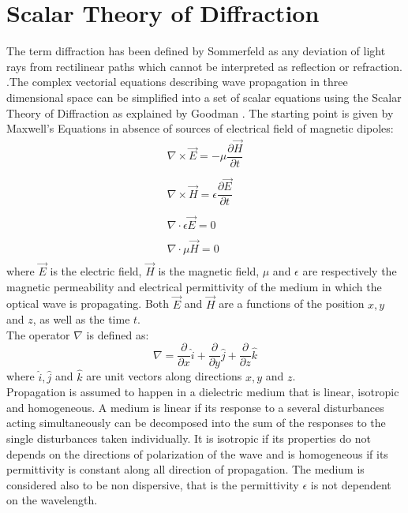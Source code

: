 \section{Scalar Theory of Diffraction}
\label{sec:scalar}
The term diffraction has been defined by Sommerfeld as any deviation of light rays from rectilinear paths which cannot be interpreted as reflection or refraction. \cite{sommerfeld1954optics}.The complex vectorial equations describing wave propagation in three dimensional space can be simplified into a set of scalar equations using the Scalar Theory of Diffraction as explained by Goodman \cite{goodman2005introduction}.
The starting point is given by Maxwell's Equations in absence of sources of electrical field of magnetic dipoles:\\
\begin{equation}
\label{eq:maxwell}
\begin{matrix}
	\nabla\times\overrightarrow{E}=-\mu\dfrac{\partial\overrightarrow{H}}{\partial t}\\
	\\
	\nabla\times\overrightarrow{H}=\epsilon\dfrac{\partial\overrightarrow{E}}{\partial t}\\
	\\
	\nabla\cdot\epsilon\overrightarrow{E}=0\\
	\\
	\nabla\cdot\mu\overrightarrow{H}=0\\
	\end{matrix}
\end{equation}
where $\overrightarrow{E}$ is the electric field, $\overrightarrow{H}$ is the magnetic field, $\mu$ and $\epsilon$ are respectively the magnetic permeability and electrical permittivity of the medium in which the optical wave is propagating. Both $\overrightarrow{E}$ and $\overrightarrow{H}$ are a functions of the position $x,y$ and $z$, as well as the time $t$. \\The operator $\nabla$ is defined as:\\
\begin{equation}
\label{eq:nabla}
	\nabla=\dfrac{\partial}{\partial x}\widehat{i}+\dfrac{\partial}{\partial y}\widehat{j}+\dfrac{\partial}{\partial z}\widehat{k}
\end{equation}
where $\widehat{i},\widehat{j}$ and $\widehat{k}$ are unit vectors along directions $x,y$ and $z$.\\
Propagation is assumed to happen in a dielectric medium that is linear, isotropic and homogeneous. A medium is linear if its response to a several disturbances acting simultaneously can be decomposed into the sum of the responses to the single disturbances taken individually. It is isotropic if its properties do not depends on the directions of polarization of the wave and is homogeneous if its permittivity is constant along all direction of propagation. The medium is considered also to be non dispersive, that is the permittivity $\epsilon$ is not dependent on the wavelength. \\
